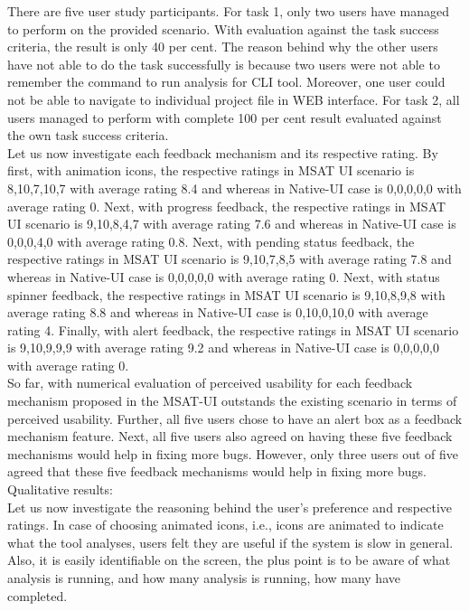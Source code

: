 There are five user study participants. For task 1, only two users have managed to perform on the provided scenario. With evaluation against the task success criteria, the result is only 40 per cent. The reason behind why the other users have not able to do the task successfully is because two users were not able to remember the command to run analysis for CLI tool. Moreover, one user could not be able to navigate to individual project file in WEB interface. For task 2, all users managed to perform with complete 100 per cent result evaluated against the own task success criteria. \\

Let us now investigate each feedback mechanism and its respective rating. By first, with animation icons, the respective ratings in MSAT UI scenario is 8,10,7,10,7 with average rating 8.4 and whereas in Native-UI case is 0,0,0,0,0 with average rating 0. Next, with progress feedback, the respective ratings in MSAT UI scenario is 9,10,8,4,7 with average rating 7.6 and whereas in Native-UI case is 0,0,0,4,0 with average rating 0.8. Next, with pending status feedback, the respective ratings in MSAT UI scenario is 9,10,7,8,5 with average rating 7.8 and whereas in Native-UI case is 0,0,0,0,0 with average rating 0. Next, with status spinner feedback, the respective ratings in MSAT UI scenario is 9,10,8,9,8 with average rating 8.8 and whereas in Native-UI case is 0,10,0,10,0 with average rating 4. Finally, with alert feedback, the respective ratings in MSAT UI scenario is 9,10,9,9,9 with average rating 9.2 and whereas in Native-UI case is 0,0,0,0,0 with average rating 0. \\

So far, with numerical evaluation of perceived usability for each feedback mechanism proposed in the MSAT-UI outstands the existing scenario in terms of perceived usability. 
Further, all five users chose to have an alert box as a feedback mechanism feature. Next, all five users also agreed on having these five feedback mechanisms would help in fixing more bugs. However, only three users out of five agreed that these five feedback mechanisms would help in fixing more bugs. \\

Qualitative results: \\

Let us now investigate the reasoning behind the user’s preference and respective ratings. In case of choosing animated icons, i.e., icons are animated to indicate what the tool analyses, users felt they are useful if the system is slow in general. Also, it is easily identifiable on the screen, the plus point is to be aware of what analysis is running, and how many analysis is running, how many have completed. \\

